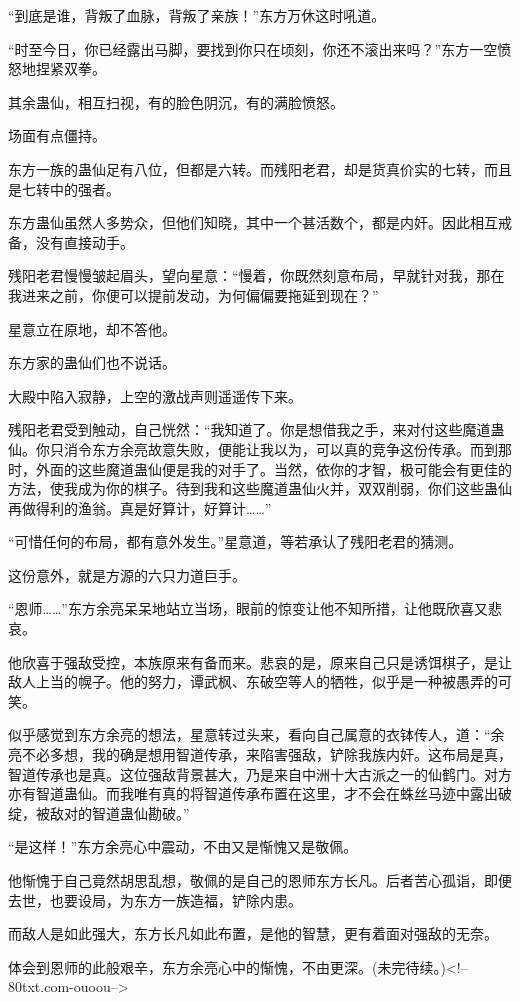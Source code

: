 \begin{this_body}
“到底是谁，背叛了血脉，背叛了亲族！”东方万休这时吼道。

“时至今日，你已经露出马脚，要找到你只在顷刻，你还不滚出来吗？”东方一空愤怒地捏紧双拳。

其余蛊仙，相互扫视，有的脸色阴沉，有的满脸愤怒。

场面有点僵持。

东方一族的蛊仙足有八位，但都是六转。而残阳老君，却是货真价实的七转，而且是七转中的强者。

东方蛊仙虽然人多势众，但他们知晓，其中一个甚活数个，都是内奸。因此相互戒备，没有直接动手。

残阳老君慢慢皱起眉头，望向星意：“慢着，你既然刻意布局，早就针对我，那在我进来之前，你便可以提前发动，为何偏偏要拖延到现在？”

星意立在原地，却不答他。

东方家的蛊仙们也不说话。

大殿中陷入寂静，上空的激战声则遥遥传下来。

残阳老君受到触动，自己恍然：“我知道了。你是想借我之手，来对付这些魔道蛊仙。你只消令东方余亮故意失败，便能让我以为，可以真的竞争这份传承。而到那时，外面的这些魔道蛊仙便是我的对手了。当然，依你的才智，极可能会有更佳的方法，使我成为你的棋子。待到我和这些魔道蛊仙火并，双双削弱，你们这些蛊仙再做得利的渔翁。真是好算计，好算计……”

“可惜任何的布局，都有意外发生。”星意道，等若承认了残阳老君的猜测。

这份意外，就是方源的六只力道巨手。

“恩师……”东方余亮呆呆地站立当场，眼前的惊变让他不知所措，让他既欣喜又悲哀。

他欣喜于强敌受控，本族原来有备而来。悲哀的是，原来自己只是诱饵棋子，是让敌人上当的幌子。他的努力，谭武枫、东破空等人的牺牲，似乎是一种被愚弄的可笑。

似乎感觉到东方余亮的想法，星意转过头来，看向自己属意的衣钵传人，道：“余亮不必多想，我的确是想用智道传承，来陷害强敌，铲除我族内奸。这布局是真，智道传承也是真。这位强敌背景甚大，乃是来自中洲十大古派之一的仙鹤门。对方亦有智道蛊仙。而我唯有真的将智道传承布置在这里，才不会在蛛丝马迹中露出破绽，被敌对的智道蛊仙勘破。”

“是这样！”东方余亮心中震动，不由又是惭愧又是敬佩。

他惭愧于自己竟然胡思乱想，敬佩的是自己的恩师东方长凡。后者苦心孤诣，即便去世，也要设局，为东方一族造福，铲除内患。

而敌人是如此强大，东方长凡如此布置，是他的智慧，更有着面对强敌的无奈。

体会到恩师的此般艰辛，东方余亮心中的惭愧，不由更深。(未完待续。)<!--80txt.com-ouoou-->

\end{this_body}

